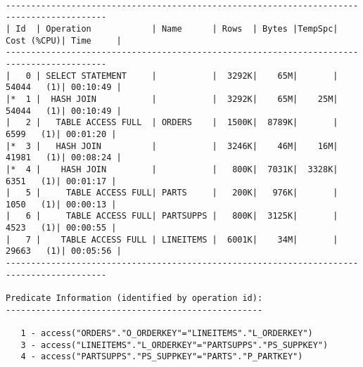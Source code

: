 \documentclass[10pt]{article}
\begin{document}
\begin{lstlisting}[style=queryexecutionplan]

------------------------------------------------------------------------------------------
| Id  | Operation            | Name      | Rows  | Bytes |TempSpc| Cost (%CPU)| Time     |
------------------------------------------------------------------------------------------
|   0 | SELECT STATEMENT     |           |  3292K|    65M|       | 54044   (1)| 00:10:49 |
|*  1 |  HASH JOIN           |           |  3292K|    65M|    25M| 54044   (1)| 00:10:49 |
|   2 |   TABLE ACCESS FULL  | ORDERS    |  1500K|  8789K|       |  6599   (1)| 00:01:20 |
|*  3 |   HASH JOIN          |           |  3246K|    46M|    16M| 41981   (1)| 00:08:24 |
|*  4 |    HASH JOIN         |           |   800K|  7031K|  3328K|  6351   (1)| 00:01:17 |
|   5 |     TABLE ACCESS FULL| PARTS     |   200K|   976K|       |  1050   (1)| 00:00:13 |
|   6 |     TABLE ACCESS FULL| PARTSUPPS |   800K|  3125K|       |  4523   (1)| 00:00:55 |
|   7 |    TABLE ACCESS FULL | LINEITEMS |  6001K|    34M|       | 29663   (1)| 00:05:56 |
------------------------------------------------------------------------------------------
 
Predicate Information (identified by operation id):
---------------------------------------------------
 
   1 - access("ORDERS"."O_ORDERKEY"="LINEITEMS"."L_ORDERKEY")
   3 - access("LINEITEMS"."L_ORDERKEY"="PARTSUPPS"."PS_SUPPKEY")
   4 - access("PARTSUPPS"."PS_SUPPKEY"="PARTS"."P_PARTKEY")
\end{lstlisting}
\end{document}
